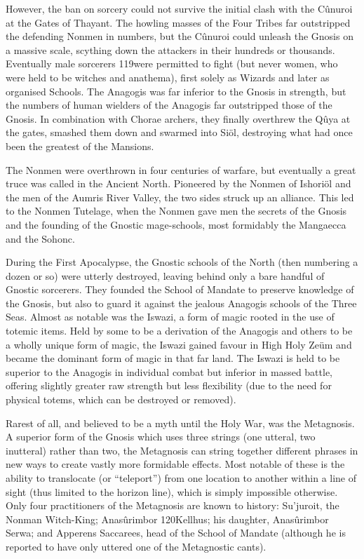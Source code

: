 \documentclass[]{book}
\begin{document}
However, the ban on sorcery could not survive the initial clash with the Cûnuroi at the
Gates of Thayant. The howling masses of the Four Tribes far outstripped the defending
Nonmen in numbers, but the Cûnuroi could unleash the Gnosis on a massive scale,
scything down the attackers in their hundreds or thousands. Eventually male sorcerers
119were permitted to fight (but never women, who were held to be witches and anathema),
first solely as Wizards and later as organised Schools. The Anagogis was far inferior to
the Gnosis in strength, but the numbers of human wielders of the Anagogis far
outstripped those of the Gnosis. In combination with Chorae archers, they finally
overthrew the Qûya at the gates, smashed them down and swarmed into Siöl,
destroying what had once been the greatest of the Mansions.

The Nonmen were overthrown in four centuries of warfare, but eventually a great truce
was called in the Ancient North. Pioneered by the Nonmen of Ishoriöl and the men of
the Aumris River Valley, the two sides struck up an alliance. This led to the Nonmen
Tutelage, when the Nonmen gave men the secrets of the Gnosis and the founding of
the Gnostic mage-schools, most formidably the Mangaecca and the Sohonc.

During the First Apocalypse, the Gnostic schools of the North (then numbering a
dozen or so) were utterly destroyed, leaving behind only a bare handful of Gnostic
sorcerers. They founded the School of Mandate to preserve knowledge of the Gnosis,
but also to guard it against the jealous Anagogis schools of the Three Seas.
Almost as notable was the Iswazi, a form of magic rooted in the use of totemic items.
Held by some to be a derivation of the Anagogis and others to be a wholly unique form
of magic, the Iswazi gained favour in High Holy Zeüm and became the dominant form
of magic in that far land. The Iswazi is held to be superior to the Anagogis in individual
combat but inferior in massed battle, offering slightly greater raw strength but less
flexibility (due to the need for physical totems, which can be destroyed or removed).

Rarest of all, and believed to be a myth until the Holy War, was the Metagnosis. A
superior form of the Gnosis which uses three strings (one utteral, two inutteral) rather
than two, the Metagnosis can string together different phrases in new ways to create
vastly more formidable effects. Most notable of these is the ability to translocate (or
``teleport'') from one location to another within a line of sight (thus limited to the
horizon line), which is simply impossible otherwise. Only four practitioners of the
Metagnosis are known to history: Su'juroit, the Nonman Witch-King; Anasûrimbor
120Kellhus; his daughter, Anasûrimbor Serwa; and Apperens Saccarees, head of the School
of Mandate (although he is reported to have only uttered one of the Metagnostic cants).
\end{document}
